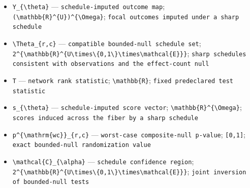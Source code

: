 \documentclass{article}
\begin{document}
\begin{itemize}
  \par\smallskip\noindent\emph{Definition.} the \(k\)-th smallest value among \(\{\theta_u(1,e)-\theta_u(0,e):u\in U\}\)
  \item \texttt{Y\_\allowbreak{}\{\textbackslash{}\allowbreak{}theta\}\allowbreak{}} --- \texttt{schedule-\allowbreak{}imputed outcome map}; \texttt{(\textbackslash{}\allowbreak{}mathbb\{R\}\allowbreak{}\textasciicircum{}\{U\}\allowbreak{})\textasciicircum{}\{\textbackslash{}\allowbreak{}Omega\}\allowbreak{}}; \texttt{focal outcomes imputed under a sharp schedule}
  \item \texttt{\textbackslash{}\allowbreak{}Theta\_\allowbreak{}\{r,\allowbreak{}c\}\allowbreak{}} --- \texttt{compatible bounded-\allowbreak{}null schedule set}; \texttt{2\textasciicircum{}\{\textbackslash{}\allowbreak{}mathbb\{R\}\allowbreak{}\textasciicircum{}\{U\textbackslash{}\allowbreak{}times\textbackslash{}\allowbreak{}\{0,\allowbreak{}1\textbackslash{}\allowbreak{}\}\allowbreak{}\textbackslash{}\allowbreak{}times\textbackslash{}\allowbreak{}mathcal\{E\}\allowbreak{}\}\allowbreak{}\}\allowbreak{}}; \texttt{sharp schedules consistent with observations and the effect-\allowbreak{}count null}
  \item \texttt{T} --- \texttt{network rank statistic}; \texttt{\textbackslash{}\allowbreak{}mathbb\{R\}\allowbreak{}}; \texttt{fixed predeclared test statistic}
  \item \texttt{s\_\allowbreak{}\{\textbackslash{}\allowbreak{}theta\}\allowbreak{}} --- \texttt{schedule-\allowbreak{}imputed score vector}; \texttt{\textbackslash{}\allowbreak{}mathbb\{R\}\allowbreak{}\textasciicircum{}\{\textbackslash{}\allowbreak{}Omega\}\allowbreak{}}; \texttt{scores induced across the fiber by a sharp schedule}
  \item \texttt{p\textasciicircum{}\{\textbackslash{}\allowbreak{}mathrm\{wc\}\allowbreak{}\}\allowbreak{}\_\allowbreak{}\{r,\allowbreak{}c\}\allowbreak{}} --- \texttt{worst-\allowbreak{}case composite-\allowbreak{}null p-\allowbreak{}value}; \texttt{[0,\allowbreak{}1]}; \texttt{exact bounded-\allowbreak{}null randomization value}
  \item \texttt{\textbackslash{}\allowbreak{}mathcal\{C\}\allowbreak{}\_\allowbreak{}\{\textbackslash{}\allowbreak{}alpha\}\allowbreak{}} --- \texttt{schedule confidence region}; \texttt{2\textasciicircum{}\{\textbackslash{}\allowbreak{}mathbb\{R\}\allowbreak{}\textasciicircum{}\{U\textbackslash{}\allowbreak{}times\textbackslash{}\allowbreak{}\{0,\allowbreak{}1\textbackslash{}\allowbreak{}\}\allowbreak{}\textbackslash{}\allowbreak{}times\textbackslash{}\allowbreak{}mathcal\{E\}\allowbreak{}\}\allowbreak{}\}\allowbreak{}}; \texttt{joint inversion of bounded-\allowbreak{}null tests}

\end{itemize}
\end{document}
